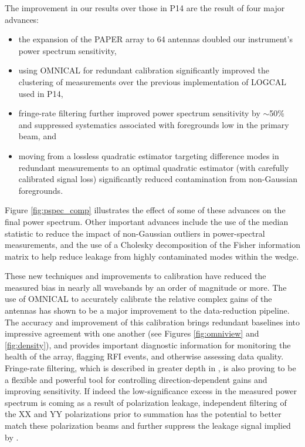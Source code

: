 \documentclass[twocolumn,numberedappendix]{emulateapj} \shorttitle{PSA64}
\begin{document}
The improvement in our results over those in P14 are the result of four
major advances:
\begin{itemize}
\item the expansion of the PAPER array to 64 antennas doubled our instrument's power spectrum sensitivity,
\item using OMNICAL for redundant calibration significantly improved the clustering of measurements
over the previous implementation of LOGCAL used in P14,
\item fringe-rate filtering further improved power spectrum sensitivity by $\sim$50\% and suppressed
systematics associated with foregrounds low in the primary beam, and
\item moving from a lossless quadratic estimator targeting difference modes
in redundant measurements to an optimal quadratic estimator (with carefully calibrated signal
loss) significantly reduced contamination from non-Gaussian foregrounds.
\end{itemize}
Figure \ref{fig:pspec_comp} illustrates the effect of some of these advances on the final
power spectrum.
Other important advances include the use of the median statistic to reduce the impact
of non-Gaussian outliers in power-spectral measurements, and the use of a Cholesky
decomposition of the Fisher information matrix to help reduce leakage 
from highly contaminated modes within the wedge.

These new techniques and improvements to calibration have reduced the measured
bias in nearly all wavebands by an order of magnitude or more. 
The use of
OMNICAL to accurately calibrate the relative complex gains of the antennas has
shown to be a major improvement to the data-reduction pipeline. The accuracy and improvement of
this calibration brings redundant baselines into impressive agreement with one another
(see Figures \ref{fig:omniview} and \ref{fig:density}),
and provides important diagnostic information for
monitoring the health of the
array, flagging RFI events, and otherwise assessing data quality.
Fringe-rate filtering, which is described in greater depth in \citep{parsons_et_al2015}, is also
proving to be a flexible and powerful tool for controlling direction-dependent gains and
improving sensitivity.  If indeed the low-significance excess in the measured power spectrum
is coming as a result of polarization leakage, independent filtering of the XX and YY polarizations
prior to summation has the potential to better match these polarization beams and further suppress 
the leakage signal implied by \citet{moore_et_al2015}.
\end{document}
